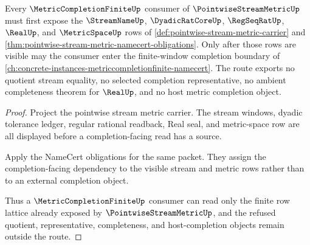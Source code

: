 \begin{theorem}
\label{thm:pointwise-stream-metric-orphan-lattice-route}
Every $\MetricCompletionFiniteUp$ consumer of $\PointwiseStreamMetricUp$ must first expose the $\StreamNameUp$, $\DyadicRatCoreUp$, $\RegSeqRatUp$, $\RealUp$, and $\MetricSpaceUp$ rows of \autoref{def:pointwise-stream-metric-carrier} and \autoref{thm:pointwise-stream-metric-namecert-obligations}. Only after those rows are visible may the consumer enter the finite-window completion boundary of \autoref{ch:concrete-instances-metriccompletionfinite-namecert}. The route exports no quotient stream equality, no selected completion representative, no ambient completeness theorem for $\RealUp$, and no host metric completion object.
\end{theorem}
\begin{proof}
Project the pointwise stream metric carrier. The stream windows, dyadic tolerance ledger, regular rational readback, Real seal, and metric-space row are all displayed before a completion-facing read has a source.

Apply the NameCert obligations for the same packet. They assign the completion-facing dependency to the visible stream and metric rows rather than to an external completion object.

Thus a $\MetricCompletionFiniteUp$ consumer can read only the finite row lattice already exposed by $\PointwiseStreamMetricUp$, and the refused quotient, representative, completeness, and host-completion objects remain outside the route.
\end{proof}

